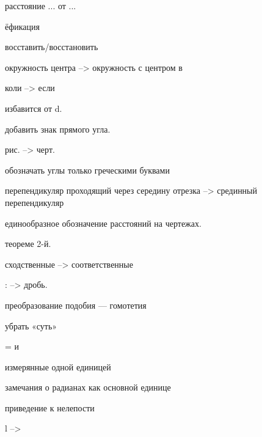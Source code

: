расстояние ... от ...

ёфикация

восставить/восстановить

окружность центра --> окружность с центром в

коли --> если

избавится от d.

добавить знак прямого угла.

рис. --> черт.

обозначать углы только греческими буквами

перепендикуляр проходящий через середину отрезка --> срединный перепендикуляр

единообразное обозначение расстояний на чертежах.

теореме 2-й.

сходственные --> соответственные

: --> дробь.

преобразование подобия --- гомотетия

убрать «суть»

= и \approx

измерянные одной единицей

замечания о радианах как основной единице

приведение к нелепости

l --> \ell